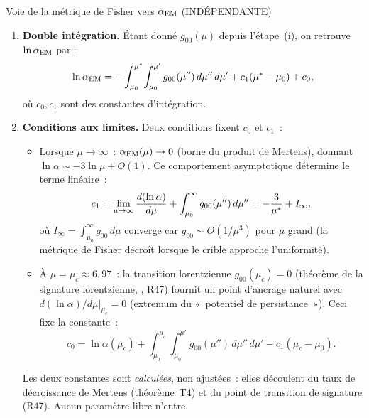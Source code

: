 \documentclass[12pt,a4paper]{article}
\begin{document}
\begin{derbox}{Voie de la métrique de Fisher vers $\alpha_{\mathrm{EM}}$ (INDÉPENDANTE)}
\begin{enumerate}[leftmargin=*, label=\textbf{(\roman*)}]
\item \textbf{Double intégration.}
  Étant donné $g_{00}(\mu)$ depuis l'étape~(i), on retrouve
  $\ln\alpha_{\mathrm{EM}}$ par~:
  \begin{equation}
    \ln\alpha_{\mathrm{EM}} = -\int_{\mu_0}^{{\mu^{*}}}\!\int_{\mu_0}^{\mu'}
    g_{00}(\mu'')\,d\mu''\,d\mu' + c_1({\mu^{*}} - \mu_0) + c_0,
    \label{eq:fisher_inversion}
  \end{equation}
  où $c_0, c_1$ sont des constantes d'intégration.

\item \textbf{Conditions aux limites.}
  Deux conditions fixent $c_0$ et $c_1$~:
  \begin{itemize}[nosep]
  \item Lorsque $\mu \to \infty$~: $\alpha_{\mathrm{EM}}(\mu) \to 0$ (borne
    du produit de Mertens), donnant $\ln\alpha \sim -3\ln\mu + O(1)$.
    Ce comportement asymptotique détermine le terme linéaire~:
    \begin{equation}
      c_1 = \lim_{\mu\to\infty}\frac{d(\ln\alpha)}{d\mu}
      + \int_{\mu_0}^{\infty} g_{00}(\mu'')\,d\mu''
      = -\frac{3}{{\mu^{*}}} + I_\infty,
      \label{eq:c1_fisher}
    \end{equation}
    où $I_\infty = \int_{\mu_0}^{\infty} g_{00}\,d\mu$ converge
    car $g_{00} \sim O(1/\mu^3)$ pour $\mu$ grand (la métrique de
    Fisher décroît lorsque le crible approche l'uniformité).
  \item À $\mu = \mu_c \approx 6{,}97$~: la transition
    lorentzienne $g_{00}(\mu_c) = 0$ (théorème de la signature
    lorentzienne, \cite{companion_physics}, R47) fournit un point
    d'ancrage naturel avec $d(\ln\alpha)/d\mu|_{\mu_c} = 0$
    (extremum du «~potentiel de persistance~»). Ceci fixe la
    constante~:
    \begin{equation}
      c_0 = \ln\alpha(\mu_c)
      + \int_{\mu_0}^{\mu_c}\!\int_{\mu_0}^{\mu'}
      g_{00}(\mu'')\,d\mu''\,d\mu'
      - c_1(\mu_c - \mu_0).
      \label{eq:c0_fisher}
    \end{equation}
  \end{itemize}
  Les deux constantes sont \emph{calculées}, non ajustées~: elles
  découlent du taux de décroissance de Mertens (théorème~T4) et
  du point de transition de signature (R47). Aucun paramètre libre
  n'entre.


\end{enumerate}
\end{derbox}
\end{document}
